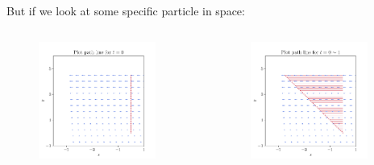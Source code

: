 \documentclass[11pt,]{beamer}
\begin{document}
\begin{frame}
	But if we look at some specific particle in space:
	\begin{columns}[t]
		\begin{column}{0.5\textwidth}
			\begin{figure}
			\includegraphics[page=1, width=0.9\textwidth]{flow-(-y,0)-path-initial.pdf}
			\end{figure}
		\end{column}
		\begin{column}{0.5\textwidth}
			\begin{figure}
			\includegraphics[page=1, width=0.9\textwidth]{flow-(-y,0)-path-final.pdf}
			\end{figure}
		\end{column}
	\end{columns}
\end{frame}
\end{document}
